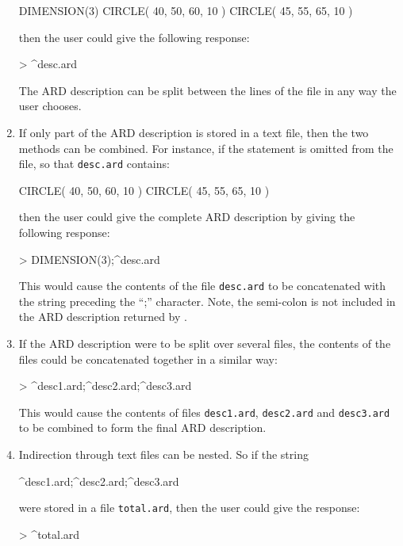 \documentclass[11pt]{starlink}
\begin{document}
\begin{enumerate}
\small
\begin{terminalv}
      DIMENSION(3)
      CIRCLE( 40, 50, 60, 10 )
      CIRCLE( 45, 55, 65, 10 )
\end{terminalv}
\normalsize

then the user could give the following response:

\small
\begin{terminalv}
      > ^desc.ard
\end{terminalv}
\normalsize

The ARD description can be split between the lines of the file in any way the
user chooses.

\item If only part of the ARD description is stored in a text file, then the two
methods can be combined. For instance, if the  statement is omitted
from the file, so that \verb+desc.ard+ contains:

\small
\begin{terminalv}
      CIRCLE( 40, 50, 60, 10 )
      CIRCLE( 45, 55, 65, 10 )
\end{terminalv}
\normalsize

then the user could give the complete ARD description by giving the following
response:

\small
\begin{terminalv}
      > DIMENSION(3);^desc.ard
\end{terminalv}
\normalsize

This would cause the contents of the file \verb+desc.ard+ to be concatenated with the
string preceding the ``;'' character. Note, the semi-colon is not included in
the ARD description returned by .

\item If the ARD description were to be split over several files, the contents
of the files could be concatenated together in a similar way:

\small
\begin{terminalv}
      > ^desc1.ard;^desc2.ard;^desc3.ard
\end{terminalv}
\normalsize

This would cause the contents of files \verb+desc1.ard+, \verb+desc2.ard+ and
\verb+desc3.ard+ to be
combined to form the final ARD description.

\item Indirection through text files can be nested. So if the string

\small
\begin{terminalv}
      ^desc1.ard;^desc2.ard;^desc3.ard
\end{terminalv}
\normalsize

were stored in a file \verb+total.ard+, then the user could give the response:

\small
\begin{terminalv}
      > ^total.ard
\end{terminalv}
\normalsize

\end{enumerate}
\end{document}
